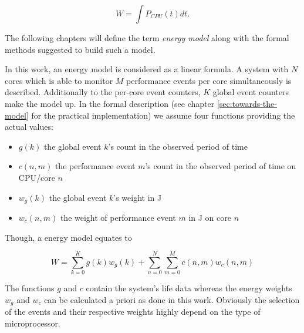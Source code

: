 \begin{equation}
  W = \int P_{CPU}(t)dt.
\end{equation}


\label{sec:model}

The following chapters will define the term \emph{energy model} along with  the
formal methods suggested to build such a model.


\label{sec:model-properties}

In this work, an energy model is considered as a linear formula. A system with
$N$ cores which is able to monitor $M$ performance events per core
simultaneously is described. Additionally to the per-core event counters, $K$
global event counters make the model up. In the formal description (see chapter
\ref{sec:towards-the-model} for the practical implementation) we assume four
functions providing the actual values:

\begin{itemize}

\item $g(k)$ the global event $k$'s count in the observed period of time

\item $c(n, m)$ the performance event $m$'s count in the observed period of time
      on CPU/core $n$

\item $w_g(k)$ the global event $k$'s weight in \si{\joule}

\item $w_c(n, m)$ the weight of performance event $m$ in \si{\joule} on core
$n$

\end{itemize}

Though, a energy model equates to

\begin{equation}
W = \sum\limits_{k=0}^K g(k) w_g(k) +
\sum\limits_{n=0}^N \sum\limits_{m=0}^M c(n, m) w_c(n,m)
\end{equation}

The functions $g$ and $c$ contain the system's life data whereas the energy
weights $w_g$ and $w_c$ can be calculated a priori as done in this work.
Obviously the selection of the events and their respective weights highly depend
on the type of microprocessor.


